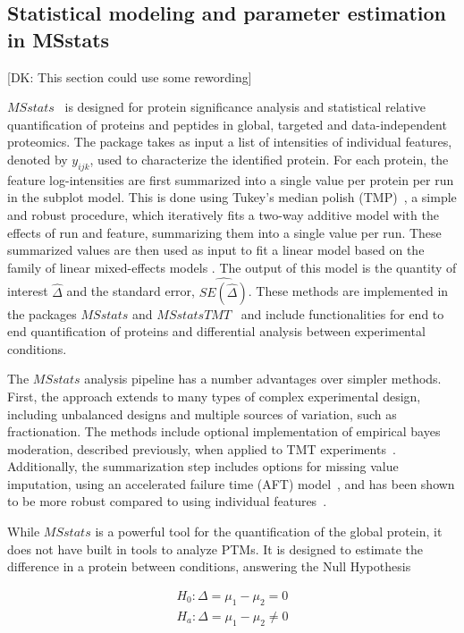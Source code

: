 \documentclass[mcp]{article}
\numberwithin{table}{section}
\def\todo#1{{\color{red}[#1]}}
\begin{document}
\subsection*{Statistical modeling and parameter estimation in MSstats}

\todo{DK: This section could use some rewording}

$MSstats$~\cite{Choi:2014} is designed for protein significance analysis and statistical relative quantification of proteins and peptides in global, targeted and data-independent proteomics. The package takes as input a list of intensities of individual features, denoted by $y_{ijk}$, used to characterize the identified protein. For each protein, the feature log-intensities are first summarized into a single value per protein per run in the subplot model. This is done using Tukey's median polish (TMP)~\cite{Tukey:1977}, a simple and robust procedure, which iteratively fits a two-way additive model with the effects of run and feature, summarizing them into a single value per run. These summarized values are then used as input to fit a linear model based on the family of linear mixed-effects models \cite{Bolker2009} \cite{Faraway:2006}. The output of this model is the quantity of interest $\hat{\Delta}$ and the standard error, $\widehat{SE(\hat{\Delta})}$. These methods are implemented in the packages $MSstats$ and $MSstatsTMT$~\cite{Huang:2020} and include functionalities for end to end quantification of proteins and differential analysis between experimental conditions.

The $MSstats$ analysis pipeline has a number advantages over simpler methods. First, the approach extends to many types of complex experimental design, including unbalanced designs and multiple sources of variation, such as fractionation. The methods include optional implementation of empirical bayes moderation, described previously, when applied to TMT experiments~\cite{Huang:2020}. Additionally, the summarization step includes options for missing value imputation, using an accelerated failure time (AFT) model~\cite{Wei:1992}, and has been shown to be more robust compared to using individual features~\cite{Choi:2014}.

While $MSstats$ is a powerful tool for the quantification of the global protein, it does not have built in tools to analyze PTMs. It is designed to estimate the difference in a protein between conditions, answering the Null Hypothesis

\begin{equation}
\begin{aligned}
H_{0}: \Delta = \mu_{1} - \mu_{2} = 0 \\
H_{a}: \Delta = \mu_{1} - \mu_{2} \neq 0
\end{aligned}
\label{eq:msstats_null_hyp}
\end{equation}
\end{document}
